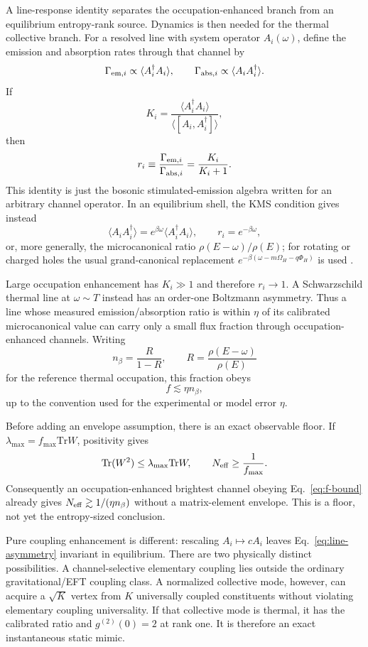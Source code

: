 \documentclass[12pt]{article}
\newcommand{\be}{\begin{equation}}
\newcommand{\ee}{\end{equation}}
\newcommand{\Tr}{\mathrm{Tr}}
\newcommand{\Neff}{N_{\rm eff}}
\begin{document}
A line-response identity separates the occupation-enhanced branch from
an equilibrium entropy-rank source.  Dynamics is then needed for the
thermal collective branch.  For a resolved line with
system operator $A_i(\omega)$, define the emission and absorption rates
through that channel by
\be
  \Gamma_{{\rm em},i}\propto
  \langle A_i^\dagger A_i\rangle,
  \qquad
  \Gamma_{{\rm abs},i}\propto
  \langle A_i A_i^\dagger\rangle .
\ee
If
\be
  K_i=
  \frac{\langle A_i^\dagger A_i\rangle}
       {\langle [A_i,A_i^\dagger]\rangle},
\ee
then
\be
  r_i\equiv
  \frac{\Gamma_{{\rm em},i}}{\Gamma_{{\rm abs},i}}
  =
  \frac{K_i}{K_i+1}.
\label{eq:line-asymmetry}
\ee
This identity is just the bosonic stimulated-emission algebra written
for an arbitrary channel operator.  In an equilibrium shell, the KMS
condition gives instead
\be
  \langle A_i A_i^\dagger\rangle
  =
  e^{\beta\omega}\langle A_i^\dagger A_i\rangle,
  \qquad
  r_i=e^{-\beta\omega},
\ee
or, more generally, the microcanonical ratio
$\rho(E-\omega)/\rho(E)$; for rotating or charged holes the usual
grand-canonical replacement
$e^{-\beta(\omega-m\Omega_H-q\Phi_H)}$ is used
\cite{HaagHugenholtzWinnink1967,BekensteinMeisels1977,
PanangadenWald1977}.

Large occupation enhancement has $K_i\gg1$ and therefore
$r_i\to1$.  A Schwarzschild thermal line at $\omega\sim T$ instead has
an order-one Boltzmann asymmetry.  Thus a line whose measured
emission/absorption ratio is within $\eta$ of its calibrated
microcanonical value can carry only a small flux fraction through
occupation-enhanced channels.  Writing
\be
  n_\beta = \frac{R}{1-R},
  \qquad
  R=\frac{\rho(E-\omega)}{\rho(E)}
\ee
for the reference thermal occupation, this fraction obeys
\be
  f \lesssim \eta n_\beta ,
\label{eq:f-bound}
\ee
up to the convention used for the experimental or model error $\eta$.

Before adding an envelope assumption, there is an exact observable
floor.  If $\lambda_{\max}=f_{\max}\Tr W$, positivity gives
\be
  \Tr(W^2)\leq \lambda_{\max}\Tr W,
  \qquad
  \Neff\geq \frac{1}{f_{\max}}.
\label{eq:pure-floor}
\ee
Consequently an occupation-enhanced brightest channel obeying
Eq.~\eqref{eq:f-bound} already gives
$\Neff\gtrsim1/(\eta n_\beta)$ without a matrix-element envelope.
This is a floor, not yet the entropy-sized conclusion.

Pure coupling enhancement is different: rescaling $A_i\mapsto cA_i$
leaves Eq.~\eqref{eq:line-asymmetry} invariant in equilibrium.  There
are two physically distinct possibilities.  A channel-selective
elementary coupling lies outside the ordinary gravitational/EFT
coupling class.  A normalized collective mode, however, can acquire a
$\sqrt K$ vertex from $K$ universally coupled constituents without
violating elementary coupling universality.  If that collective mode is
thermal, it has the calibrated ratio and $g^{(2)}(0)=2$ at rank one.
It is therefore an exact instantaneous static mimic.
\end{document}
